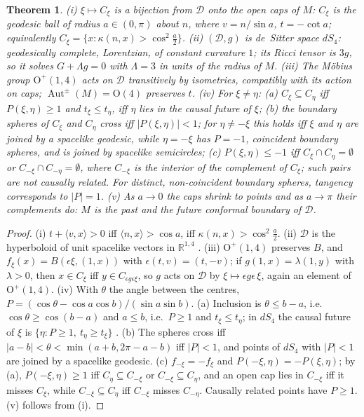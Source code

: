 \documentclass[aps,pra,onecolumn,superscriptaddress,nofootinbib,10pt]{revtex4-2}
\newtheorem{theorem}{Theorem}
\theoremstyle{definition}
\theoremstyle{remark}
\newcommand{\R}{\mathbb{R}}
\newcommand{\cD}{\mathcal{D}}
\newcommand{\Aut}{\operatorname{Aut}}
\newcommand{\ip}[2]{\langle #1,#2\rangle}
\newcommand{\OO}{\mathrm{O}}
\begin{document}
\begin{theorem}\label{thm:desitter}
(i) $\xi\mapsto C_\xi$ is a bijection from $\cD$ onto the open caps of $M$: $C_\xi$ is the geodesic
ball of radius $a\in(0,\pi)$ about $n$, where $v=n/\sin a$, $t=-\cot a$; equivalently
$C_\xi=\{x:\kappa(n,x)>\cos^2\tfrac a2\}$.
(ii) $(\cD,g)$ is de~Sitter space $dS_4$: geodesically complete, Lorentzian, of constant curvature $1$;
its Ricci tensor is $3g$, so it solves $G+\Lambda g=0$ with $\Lambda=3$ in units of the radius of $M$.
(iii) The M\"obius group $\OO^+(1,4)$ acts on $\cD$ transitively by isometries, compatibly with its
action on caps; $\Aut^\pm(M)=\OO(4)$ preserves $t$.
(iv) For $\xi\ne\eta$:
(a) $C_\xi\subseteq C_\eta$ iff $P(\xi,\eta)\ge1$ and $t_\xi\le t_\eta$, iff $\eta$ lies in the causal
future of $\xi$;
(b) the boundary spheres of $C_\xi$ and $C_\eta$ cross iff $\lvert P(\xi,\eta)\rvert<1$; for $\eta\ne-\xi$ this holds iff $\xi$ and
$\eta$ are joined by a spacelike geodesic, while $\eta=-\xi$ has $P=-1$, coincident boundary spheres, and is
joined by spacelike semicircles;
(c) $P(\xi,\eta)\le-1$ iff $C_\xi\cap C_\eta=\emptyset$ or $C_{-\xi}\cap C_{-\eta}=\emptyset$, where
$C_{-\xi}$ is the interior of the complement of $C_\xi$; such pairs are not causally related.
For distinct, non-coincident boundary spheres, tangency corresponds to $\lvert P\rvert=1$.
(v) As $a\to0$ the caps shrink to points and as $a\to\pi$ their complements do: $M$ is the past and
the future conformal boundary of $\cD$.
\end{theorem}
\begin{proof}
(i) $t+\ip{v}{x}>0$ iff $\ip{n}{x}>\cos a$, iff $\kappa(n,x)>\cos^2\tfrac a2$.  (ii) $\cD$ is the
hyperboloid of unit spacelike vectors in $\R^{1,4}$ \cite{ONeill,HawkingEllis}.  (iii) $\OO^+(1,4)$
preserves $B$, and $f_\xi(x)=B(\epsilon\xi,(1,x))$ with $\epsilon(t,v)=(t,-v)$; if $g(1,x)=\lambda(1,y)$
with $\lambda>0$, then $x\in C_\xi$ iff $y\in C_{\epsilon g\epsilon\xi}$, so $g$ acts on $\cD$ by
$\xi\mapsto\epsilon g\epsilon\,\xi$, again an element of $\OO^+(1,4)$.  (iv) With $\theta$ the angle between the centres,
$P=(\cos\theta-\cos a\cos b)/(\sin a\sin b)$.  (a) Inclusion is $\theta\le b-a$, i.e.\
$\cos\theta\ge\cos(b-a)$ and $a\le b$, i.e.\ $P\ge1$ and $t_\xi\le t_\eta$; in $dS_4$ the causal future of
$\xi$ is $\{\eta:P\ge1,\ t_\eta\ge t_\xi\}$ \cite{ONeill}.  (b) The spheres cross iff
$\lvert a-b\rvert<\theta<\min(a+b,2\pi-a-b)$ iff $\lvert P\rvert<1$, and points of $dS_4$ with
$\lvert P\rvert<1$ are joined by a spacelike geodesic.  (c) $f_{-\xi}=-f_\xi$ and $P(-\xi,\eta)=-P(\xi,\eta)$;
by (a), $P(-\xi,\eta)\ge1$ iff $C_\eta\subseteq C_{-\xi}$ or $C_{-\xi}\subseteq C_\eta$, and an open cap
lies in $C_{-\xi}$ iff it misses $C_\xi$, while $C_{-\xi}\subseteq C_\eta$ iff $C_{-\xi}$ misses $C_{-\eta}$.
Causally related points have $P\ge1$.  (v) follows from (i).
\end{proof}
\end{document}
